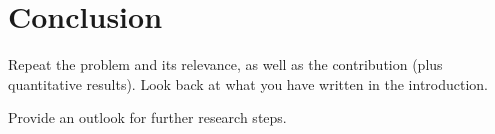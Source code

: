 \section{Conclusion}
\label{sec:conclusion}

Repeat the problem and its relevance, as well as the contribution (plus quantitative results). 
Look back at what you have written in the introduction.

Provide an outlook for further research steps.